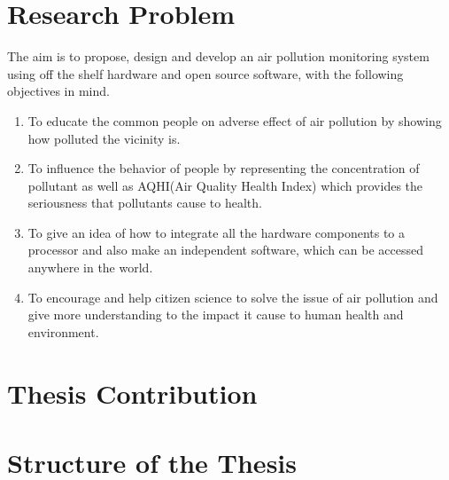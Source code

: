 \section{Research Problem}
The aim is to propose, design and develop an air pollution monitoring system using off the shelf
hardware and open source software, with the following objectives in mind.
\begin{enumerate}
   
    \item To educate the common people on adverse effect of air pollution by showing how polluted
    the vicinity is.
    
    \item To influence the behavior of people by representing the concentration of pollutant as well
    as AQHI(Air Quality Health Index) which provides the seriousness that pollutants cause
    to health.
    
    \item To give an idea of how to integrate all the hardware components to a processor and also
    make an independent software, which can be accessed anywhere in the world.
    
    \item To encourage and help citizen science to solve the issue of air pollution and give more
    understanding to the impact it cause to human health and environment.

\end{enumerate}


\section{Thesis Contribution}

\section{Structure of the Thesis}